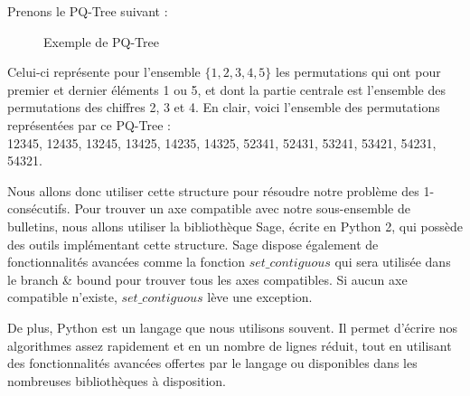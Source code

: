 \documentclass[11pt, a4paper]{article}
\begin{document}
Prenons le PQ-Tree suivant :

\begin{figure}[H]
\centering
{}
\label{PQ-Tree-Exemple}
\caption{Exemple de PQ-Tree}
\end{figure}

\noindent Celui-ci représente pour l'ensemble $\{1,2,3,4,5\}$ les permutations qui ont pour premier et dernier éléments 1 ou 5, et dont la partie centrale est l'ensemble des permutations des chiffres 2, 3 et 4. En clair, voici l'ensemble des permutations représentées par ce PQ-Tree :\\ 12345, 12435, 13245, 13425, 14235, 14325, 52341, 52431, 53241, 53421, 54231, 54321.

\bigskip
Nous allons donc utiliser cette structure pour résoudre notre problème des 1-consécutifs. Pour trouver un axe compatible avec notre sous-ensemble de bulletins, nous allons utiliser la bibliothèque Sage, écrite en Python 2, qui possède des outils implémentant cette structure. Sage dispose également de fonctionnalités avancées comme la fonction $set\_contiguous$ qui sera utilisée dans le branch \& bound pour trouver tous les axes compatibles. Si aucun axe compatible n'existe, $set\_contiguous$ lève une exception.


De plus, Python est un langage que nous utilisons souvent. Il permet d'écrire nos algorithmes assez rapidement et en un nombre de lignes réduit, tout en utilisant des fonctionnalités avancées offertes par le langage ou disponibles dans les nombreuses bibliothèques à disposition.
\end{document}
